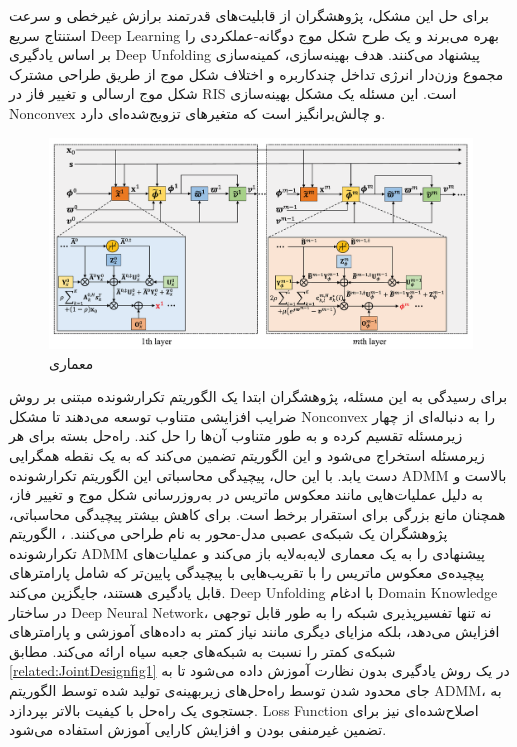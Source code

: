 برای حل این مشکل، پژوهشگران از قابلیت‌های قدرتمند برازش غیرخطی و سرعت استنتاج سریع 
\gls{Deep Learning}
بهره می‌برند و یک طرح شکل موج دوگانه-عملکردی را بر اساس یادگیری 
\gls{Deep Unfolding}
پیشنهاد می‌کنند. هدف بهینه‌سازی، کمینه‌سازی مجموع وزن‌دار انرژی تداخل چندکاربره و اختلاف شکل موج از طریق طراحی مشترک شکل موج ارسالی و تغییر فاز در 
\gls{RIS}
است. این مسئله یک مشکل بهینه‌سازی 
\gls{Nonconvex}
و چالش‌برانگیز است که متغیرهای تزویج‌شده‌ای دارد.
\begin{figure}
	\centering
	\includegraphics[width=0.9\linewidth]{./Pic/JointDesign_fig1}
	\caption[ معماری ]{معماری  \cite{DeepUnfoldingBased}}
		\label{related:JointDesignfig1}
	\end{figure}
برای رسیدگی به این مسئله، پژوهشگران ابتدا یک الگوریتم تکرارشونده مبتنی بر روش ضرایب افزایشی متناوب توسعه می‌دهند تا مشکل 
\gls{Nonconvex}
را به دنباله‌ای از چهار زیرمسئله تقسیم کرده و به طور متناوب آن‌ها را حل کند. راه‌حل بسته برای هر زیرمسئله استخراج می‌شود و این الگوریتم تضمین می‌کند که به یک نقطه همگرایی دست یابد. با این حال، پیچیدگی محاسباتی این الگوریتم تکرارشونده 
\gls{ADMM}
بالاست و به دلیل عملیات‌هایی مانند معکوس ماتریس در به‌روزرسانی شکل موج و تغییر فاز، همچنان مانع بزرگی برای استقرار برخط است.
برای کاهش بیشتر پیچیدگی محاسباتی، پژوهشگران یک شبکه‌ی عصبی مدل-محور به نام 
طراحی می‌کنند. 
،
الگوریتم تکرارشونده 
\gls{ADMM}
پیشنهادی را به یک معماری لایه‌به‌لایه باز می‌کند و عملیات‌های پیچیده‌ی معکوس ماتریس را با تقریب‌هایی با پیچیدگی پایین‌تر که شامل پارامترهای قابل یادگیری هستند، جایگزین می‌کند. 
\gls{Deep Unfolding}
با ادغام 
\gls{Domain Knowledge}
در ساختار 
\gls{Deep Neural Network}،
 نه تنها تفسیرپذیری شبکه را به طور قابل توجهی افزایش می‌دهد، بلکه مزایای دیگری مانند نیاز کمتر به داده‌های آموزشی و پارامترهای شبکه‌ی کمتر را نسبت به شبکه‌های جعبه سیاه ارائه می‌کند. 
 مطابق 
\autoref{related:JointDesignfig1}
 در یک روش یادگیری بدون نظارت آموزش داده می‌شود تا به جای محدود شدن توسط راه‌حل‌های زیربهینه‌ی تولید شده توسط الگوریتم 
\gls{ADMM}،
به جستجوی یک راه‌حل با کیفیت بالاتر بپردازد. 
\gls{Loss Function}
اصلاح‌شده‌ای نیز برای تضمین غیرمنفی بودن و افزایش کارایی آموزش استفاده می‌شود.

